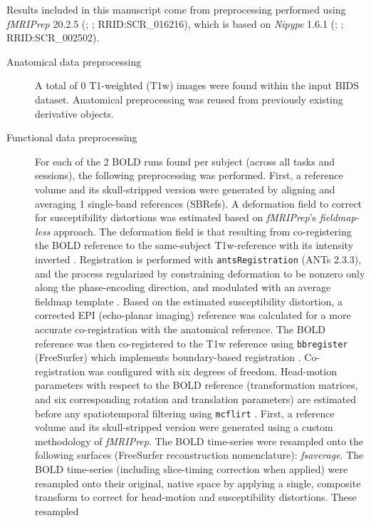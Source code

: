 \documentclass[]{article}
\date{}
\begin{document}
Results included in this manuscript come from preprocessing performed
using \emph{fMRIPrep} 20.2.5 (\citet{fmriprep1}; \citet{fmriprep2};
RRID:SCR\_016216), which is based on \emph{Nipype} 1.6.1
(\citet{nipype1}; \citet{nipype2}; RRID:SCR\_002502).

\begin{description}
\item[Anatomical data preprocessing]
A total of 0 T1-weighted (T1w) images were found within the input BIDS
dataset. Anatomical preprocessing was reused from previously existing
derivative objects.
\item[Functional data preprocessing]
For each of the 2 BOLD runs found per subject (across all tasks and
sessions), the following preprocessing was performed. First, a reference
volume and its skull-stripped version were generated by aligning and
averaging 1 single-band references (SBRefs). A deformation field to
correct for susceptibility distortions was estimated based on
\emph{fMRIPrep}'s \emph{fieldmap-less} approach. The deformation field
is that resulting from co-registering the BOLD reference to the
same-subject T1w-reference with its intensity inverted
\citep{fieldmapless1, fieldmapless2}. Registration is performed with
\texttt{antsRegistration} (ANTs 2.3.3), and the process regularized by
constraining deformation to be nonzero only along the phase-encoding
direction, and modulated with an average fieldmap template
\citep{fieldmapless3}. Based on the estimated susceptibility distortion,
a corrected EPI (echo-planar imaging) reference was calculated for a
more accurate co-registration with the anatomical reference. The BOLD
reference was then co-registered to the T1w reference using
\texttt{bbregister} (FreeSurfer) which implements boundary-based
registration \citep{bbr}. Co-registration was configured with six
degrees of freedom. Head-motion parameters with respect to the BOLD
reference (transformation matrices, and six corresponding rotation and
translation parameters) are estimated before any spatiotemporal
filtering using \texttt{mcflirt} \citep[FSL 5.0.9,][]{mcflirt}. First, a
reference volume and its skull-stripped version were generated using a
custom methodology of \emph{fMRIPrep}. The BOLD time-series were
resampled onto the following surfaces (FreeSurfer reconstruction
nomenclature): \emph{fsaverage}. The BOLD time-series (including
slice-timing correction when applied) were resampled onto their
original, native space by applying a single, composite transform to
correct for head-motion and susceptibility distortions. These resampled

\end{description}
\end{document}
